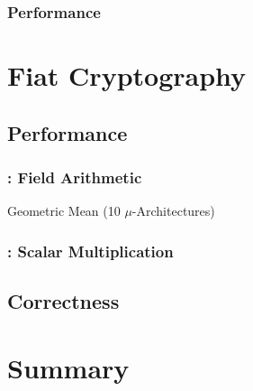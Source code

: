 \documentclass[dvipsnames,table,aspectratio=169]{beamer}
\newcommand{\fiat}{\textsf{Fiat Cryptography}\xspace}
\begin{document}
\begin{frame}[c]{}
    \frametitle{Performance}
    \centering
    

\end{frame}

\section{\fiat}
\subsection{Performance}
\begin{frame}[c]{}
    \frametitle{\insertsection}
    \centering
    \vspace{-1em}
    

\end{frame}

\begin{frame}[c]{}
    \centering
    \frametitle{\insertsubsection: Field Arithmetic}

    Geometric Mean (10 $\mu$-Architectures)\\
    

\end{frame}

\newcommand{\hil}{\cellcolor{lightgray}}
\begin{frame}[c]{}
    \centering
    \frametitle{\insertsubsection: Scalar Multiplication}
    \vspace{-1em}
     {}
     {}

\end{frame}

\subsection{Correctness}
\begin{frame}[c]{}
    \centering
    \frametitle{\insertsubsection}

    

\end{frame}



\section{Summary}
\end{document}
